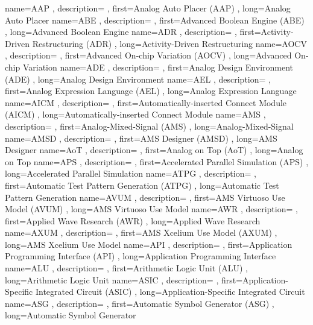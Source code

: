 \usepackage[]{glossaries}
\makeglossaries


{ name={AAP}
, description={}
, first={Analog Auto Placer (AAP)}
, long={Analog Auto Placer}
}
{ name={ABE}
, description={}
, first={Advanced Boolean Engine (ABE)}
, long={Advanced Boolean Engine}
}
{ name={ADR}
, description={}
, first={Activity-Driven Restructuring (ADR)}
, long={Activity-Driven Restructuring}
}
{ name={AOCV}
, description={}
, first={Advanced On-chip Variation (AOCV)}
, long={Advanced On-chip Variation}
}
{ name={ADE}
, description={}
, first={Analog Design Environment (ADE)}
, long={Analog Design Environment}
}
{ name={AEL}
, description={}
, first={Analog Expression Language (AEL)}
, long={Analog Expression Language}
}
{ name={AICM}
, description={}
, first={Automatically-inserted Connect Module (AICM)}
, long={Automatically-inserted Connect Module}
}
{ name={AMS}
, description={}
, first={Analog-Mixed-Signal (AMS)}
, long={Analog-Mixed-Signal}
}
{ name={AMSD}
, description={}
, first={AMS Designer (AMSD)}
, long={AMS Designer}
}
{ name={AoT}
, description={}
, first={Analog on Top (AoT)}
, long={Analog on Top}
}
{ name={APS}
, description={}
, first={Accelerated Parallel Simulation (APS)}
, long={Accelerated Parallel Simulation}
}
{ name={ATPG}
, description={}
, first={Automatic Test Pattern Generation (ATPG)}
, long={Automatic Test Pattern Generation}
}
{ name={AVUM}
, description={}
, first={AMS Virtuoso Use Model (AVUM)}
, long={AMS Virtuoso Use Model}
}
{ name={AWR}
, description={}
, first={Applied Wave Research (AWR)}
, long={Applied Wave Research}
}
{ name={AXUM}
, description={}
, first={AMS Xcelium Use Model (AXUM)}
, long={AMS Xcelium Use Model}
}
{ name={API}
, description={}
, first={Application Programming Interface (API)}
, long={Application Programming Interface}
}
{ name={ALU}
, description={}
, first={Arithmetic Logic Unit (ALU)}
, long={Arithmetic Logic Unit}
}
{ name={ASIC}
, description={}
, first={Application-Specific Integrated Circuit (ASIC)}
, long={Application-Specific Integrated Circuit}
}
{ name={ASG}
, description={}
, first={Automatic Symbol Generator (ASG)}
, long={Automatic Symbol Generator}
}

